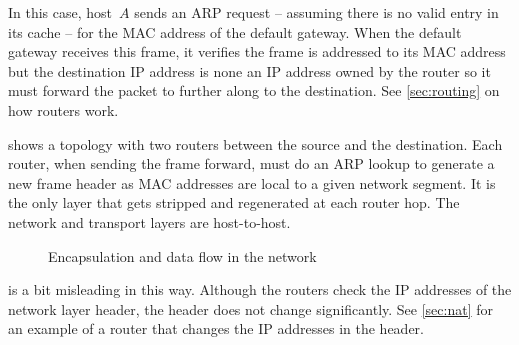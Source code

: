 {In this case, host~$A$ sends an \acs{ARP} request -- assuming there is no valid entry in its cache -- for the \acs{MAC} address of the default gateway.
When the default gateway receives this frame, it verifies the frame is addressed to its \acs{MAC} address but the destination \acs{IP} address is none an \acs{IP} address owned by the router so it must forward the packet to further along to the destination.
See \vref{sec:routing} on how routers work.

 shows a topology with two routers between the source and the destination.
Each router, when sending the frame forward, must do an \acs{ARP} lookup to generate a new frame header as \acs{MAC} addresses are local to a given network segment.
It is the only layer that gets stripped and regenerated at each router hop.
The network and transport layers are host-to-host.


\begin{figure}
\centering

\caption{Encapsulation and data flow in the network}
\label{fig:data-flow}
\end{figure}


 is a bit misleading in this way.
Although the routers check the \acs{IP} addresses of the network layer header, the header does not change significantly.
See \vref{sec:nat} for an example of a router that changes the \acs{IP} addresses in the header.
}

\label{sec:network-icons}

